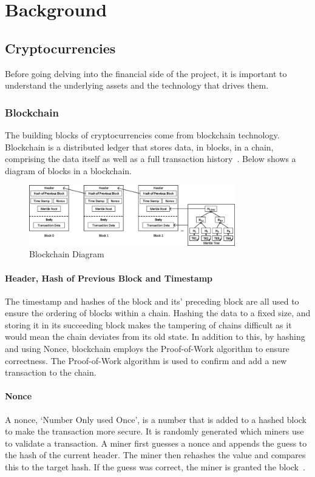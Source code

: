 \chapter{Background}
\section{Cryptocurrencies}
Before going delving into the financial side of the project, it is important to understand the underlying assets and the technology that drives them.

\subsection{Blockchain}
The building blocks of cryptocurrencies come from blockchain technology. Blockchain is a distributed ledger that stores data, in blocks, in a chain, comprising the data itself as well as a full transaction history~\cite{nofer2017blockchain}. Below shows a diagram of blocks in a blockchain.

\begin{figure}[!htb]
    \centering
    \includegraphics[width=0.8\textwidth]{background/Images/The-structure-of-a-Blockchain.png}
    \caption{Blockchain Diagram~\cite{inbookBlockchain}}
\end{figure}

\subsubsection{Header, Hash of Previous Block and Timestamp}
The timestamp and hashes of the block and its' preceding block are all used to ensure the ordering of blocks within a chain. Hashing the data to a fixed size, and storing it in its succeeding block makes the tampering of chains difficult as it would mean the chain deviates from its old state. In addition to this, by hashing and using Nonce, blockchain employs the Proof-of-Work algorithm to ensure correctness. The Proof-of-Work algorithm is used to confirm and add a new transaction to the chain.

\subsubsection{Nonce}
A nonce, `Number Only used Once', is a number that is added to a hashed block to make the transaction more secure. It is randomly generated which miners use to validate a transaction. A miner first guesses a nonce and appends the guess to the hash of the current header. The miner then rehashes the value and compares this to the target hash. If the guess was correct, the miner is granted the block~\cite{noauthor_components_2021}.

